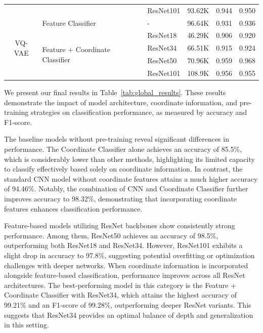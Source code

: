 \documentclass{article}
\begin{document}
\begin{table}[!htp]
\begin{tabular}{cllccc}
                                      &                                                  & ResNet101         & 93.62K            & 0.944             & 0.950             \\\cmidrule{1-6}
    \multirow{5}{*}{VQ-VAE}           & Feature Classifier                               & -                 & 96.64K            & 0.931             & 0.936             \\ \cmidrule{2-6}
                                      & \multirow{4}{*}{Feature + Coordinate Classifier} & ResNet18          & 46.29K            & 0.906             & 0.920             \\
                                      &                                                  & ResNet34          & 66.51K            & 0.915                 & 0.924                 \\
                                      &                                                  & ResNet50          & 70.96K            & 0.959             & 0.968             \\
                                      &                                                  & ResNet101         & 108.9K            & 0.956                 & 0.955                 \\\midrule
    \bottomrule
  \end{tabular}
\end{table}

We present our final results in Table~\ref{tab:global_results}. These results
demonstrate the impact of model architecture, coordinate information, and
pre-training strategies on classification performance, as measured by accuracy
and F1-score.

The baseline models without pre-training reveal significant differences in
performance. The Coordinate Classifier alone achieves an accuracy of 85.5\%,
which is considerably lower than other methods, highlighting its limited
capacity to classify effectively based solely on coordinate information. In
contrast, the standard CNN model without coordinate features attains a much
higher accuracy of 94.46\%. Notably, the combination of CNN and Coordinate
Classifier further improves accuracy to 98.32\%, demonstrating that
incorporating coordinate features enhances classification performance.

Feature-based models utilizing ResNet backbones show consistently strong
performance. Among them, ResNet50 achieves an accuracy of 98.5\%, outperforming
both ResNet18 and ResNet34. However, ResNet101 exhibits a slight drop in
accuracy to 97.8\%, suggesting potential overfitting or optimization challenges
with deeper networks. When coordinate information is incorporated alongside
feature-based classification, performance improves across all ResNet
architectures. The best-performing model in this category is the Feature +
Coordinate Classifier with ResNet34, which attains the highest accuracy of
99.21\% and an F1-score of 99.28\%, outperforming deeper ResNet variants. This
suggests that ResNet34 provides an optimal balance of depth and generalization
in this setting.
\end{document}
